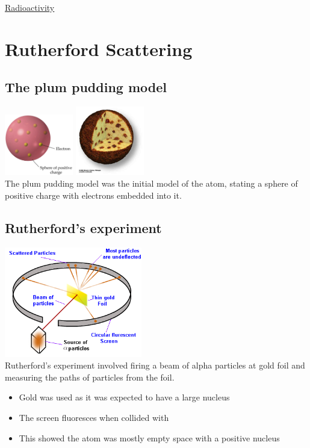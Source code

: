 \documentclass{article}[18pt]
\begin{document}
\begin{center}
\underline{\huge Radioactivity}
\end{center}
\section{Rutherford Scattering}
\subsection{The plum pudding model}
\includegraphics[width=3cm] {plum.jpg}  
\includegraphics[width=3cm] {Plumpudding.png}
\\
The plum pudding model was the initial model of the atom, stating a sphere of positive charge with electrons embedded into it.
\subsection{Rutherford's experiment}
\includegraphics[width=6cm] {scatter.png}\\
Rutherford's experiment involved firing a beam of alpha particles at gold foil and measuring the paths of particles from the foil.
\begin{itemize}
\item Gold was used as it was expected to have a large nucleus
\item The screen fluoresces when collided with
\item This showed the atom was mostly empty space with a positive nucleus
\end{itemize}
\end{document}
